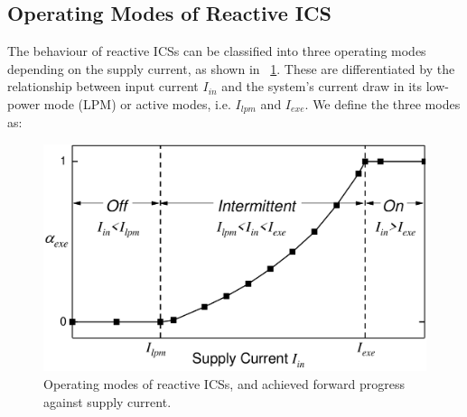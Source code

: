 \subsection{Operating Modes of Reactive ICS}

The behaviour of reactive ICSs can be classified into three operating modes depending on the supply current, as shown in \figurename{~\ref{fig:operatingModes}}. These are differentiated by the relationship between input current $I_{in}$ and the system's current draw in its low-power mode (LPM) or active modes, i.e. $I_{lpm}$ and $I_{exe}$. We define the three modes as:

\begin{figure}[!t]
  \centering
  \includegraphics[width=0.8\columnwidth]{ch3_sizingeffect/figures/OperatingMode0Fig}
  \caption{Operating modes of reactive ICSs, and achieved forward progress against supply current.}
  \label{fig:operatingModes}
\end{figure}

